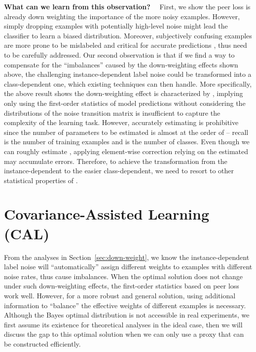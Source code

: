 \documentclass[final]{cvpr}
\newcommand{\rev}[1]{{\color{blue}#1}}
\newcommand{\rev}[1]{#1}
\begin{document}
\noindent\textbf{What can we learn from this observation?}~~
First, we show the peer loss is already down weighting the importance of the more noisy examples. However, simply dropping examples with potentially high-level noise might lead the classifier to learn a biased distribution. \rev{Moreover, subjectively confusing examples are more prone to be mislabeled and critical for accurate predictions \cite{wang2021tackling}, thus need to be carefully addressed.} Our second observation is that if we find a way to compensate for the ``imbalances'' caused by the down-weighting effects shown above, the challenging instance-dependent label noise could be transformed into a class-dependent one, which existing techniques can then handle. More specifically, the above result shows the down-weighting effect is characterized by , implying only using the first-order statistics of model predictions without considering the distributions of the noise transition matrix  is insufficient to capture the complexity of the learning task. 
However, accurately estimating  is prohibitive since the number of parameters to be estimated is almost at the order of  -- recall  is the number of training examples and  is the number of classes.
Even though we can roughly estimate , applying element-wise correction relying on the estimated  may accumulate errors.
Therefore, to achieve the transformation from the instance-dependent to the easier class-dependent, we need to resort to other statistical properties of .


 \section{Covariance-Assisted Learning (CAL)}\label{sec:theory}


From the analyses in Section~\ref{sec:down-weight}, we know the instance-dependent label noise will ``automatically'' assign different weights to examples with different noise rates, thus cause imbalances.
When the optimal solution does not change under such down-weighting effects, the first-order statistics based on peer loss \cite{sieve2020,liu2019peer} work well. 
However, for a more robust and general solution, using additional information to ``balance'' the effective weights of different examples is necessary.
Although the Bayes optimal distribution is not accessible in real experiments, we first assume its existence for theoretical analyses in the ideal case, then we will discuss the gap to this optimal solution when we can only use a proxy  that can be constructed efficiently. 
\end{document}
